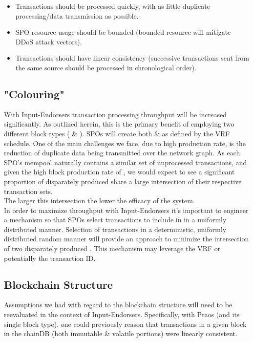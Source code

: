 \documentclass[11pt,a4paper]{article}
\begin{document}
\begin{itemize}
  \item Transactions should be processed quickly, with as little duplicate processing/data transmission as possible.
  \item SPO resource usage should be bounded (bounded resource will mitigate DDoS attack vectors).
  \item Transactions should have linear consistency (successive transactions sent from the same source should be 
        processed in chronological order).
\end{itemize}


\subsection{"Colouring"}
With Input-Endorsers transaction processing throughput will be increased significantly. As outlined herein, this is the
primary benefit of employing two different block types ( \& ).
SPOs will create both  \&  as defined by the VRF schedule. One of the main challenges we 
face, due to  high production rate, is the reduction of duplicate data being transmitted over the network 
graph.
As each SPO's mempool naturally contains a similar set of unprocessed transactions, and given the high block production 
rate of , we would expect to see a significant proportion of disparately produced  share 
a large intersection of their respective transaction sets. \\ The larger this intersection the lower the efficacy of the 
system.\\

In order to maximize throughput with Input-Endorsers it's important to engineer a mechanism so that SPOs select
transactions to include in  in a uniformly distributed manner. Selection of transactions in a 
deterministic, uniformly distributed random manner will provide an approach to minimize the intersection of two 
disparately produced . This mechanism may leverage the VRF or potentially the transaction ID.

\subsection{Blockchain Structure}
Assumptions we had with regard to the blockchain structure will need to be reevaluated in the context of 
Input-Endorsers. Specifically, with Praos (and its single block type), one could previously reason that transactions 
in a given block in the chainDB (both immutable \& volatile portions) were linearly consistent. \\ 
\end{document}
